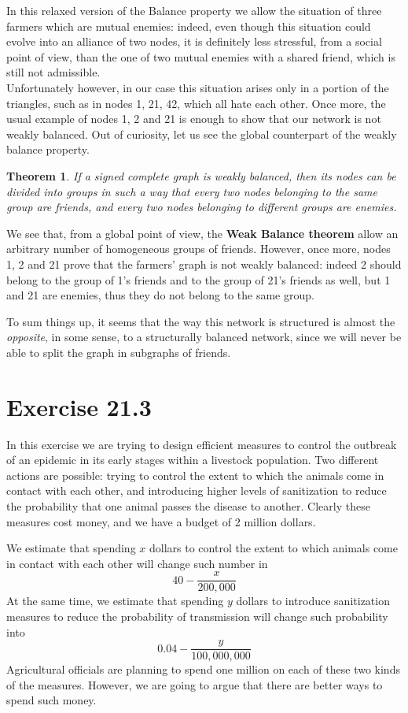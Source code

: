 \documentclass{report}
\newtheorem*{thm}{Theorem}
\theoremstyle{definition}
\theoremstyle{remark}
\begin{document}
In this relaxed version of the Balance property we allow the situation of three farmers which are mutual enemies: indeed, even though this situation could evolve into an alliance of two nodes, it is definitely less stressful, from a social point of view, than the one of two mutual enemies with a shared friend, which is still not admissible.\\
Unfortunately however, in our case this situation arises only in a portion of the triangles, such as in nodes 1, 21, 42, which all hate each other. Once more, the usual example of nodes 1, 2 and 21 is enough to show that our network is not weakly balanced. Out of curiosity, let us see the global counterpart of the weakly balance property.
\begin{thm}
	If a signed complete graph is weakly balanced, then its nodes can be divided into groups in such a way that every two nodes belonging to the same group are friends, and every two nodes belonging to different groups are enemies. 
\end{thm}
We see that, from a global point of view, the \textbf{Weak Balance theorem} allow an arbitrary number of homogeneous groups of friends. However, once more, nodes 1, 2 and 21 prove that the farmers' graph is not weakly balanced: indeed 2 should belong to the group of 1's friends and to the group of 21's friends as well, but 1 and 21 are enemies, thus they do not belong to the same group.

To sum things up, it seems that the way this network is structured is almost the \textit{opposite}, in some sense, to a structurally balanced network, since we will never be able to split the graph in subgraphs of friends.
\newpage

\section*{Exercise 21.3}
In this exercise we are trying to design efficient measures to control the outbreak of an epidemic in its early stages within a livestock  population. Two different actions are possible: trying to control the extent to which the
animals come in contact with each other, and introducing higher levels of sanitization to reduce the probability that one animal passes the disease to another. Clearly these measures cost money, and we have a budget of 2 million dollars.

We estimate that spending $x$ dollars to control the extent to which animals come in contact with each other will change such number in
\begin{equation*}
40-\frac{x}{200,000}
\end{equation*}
At the same time, we estimate that spending $y$ dollars to introduce sanitization measures to reduce the probability of transmission will change such probability into
\begin{equation*}
0.04-\frac{y}{100,000,000}
\end{equation*}
Agricultural officials are planning to spend one million on each of these two kinds of the measures. However, we are going to argue that there are better ways to spend such money.
\end{document}
